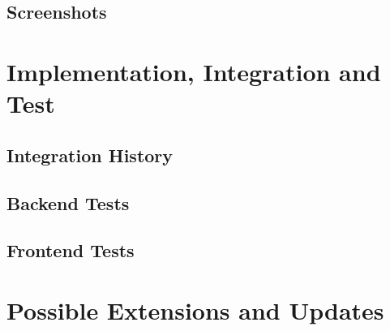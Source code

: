 \section{Screenshots}



\chapter{Implementation, Integration and Test}

\section{Integration History}

\section{Backend Tests}

\section{Frontend Tests}



\chapter{Possible Extensions and Updates}



